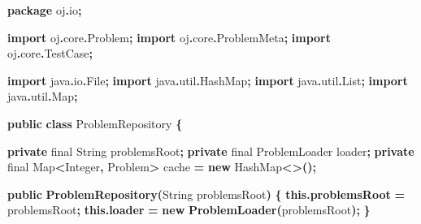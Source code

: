 \documentclass[
  11pt,
]{ctexart}
\newenvironment{Shaded}{\begin{snugshade}}{\end{snugshade}}
\newcommand{\BuiltInTok}[1]{#1}
\newcommand{\DataTypeTok}[1]{\textcolor[rgb]{0.13,0.29,0.53}{#1}}
\newcommand{\FunctionTok}[1]{\textcolor[rgb]{0.13,0.29,0.53}{\textbf{#1}}}
\newcommand{\ImportTok}[1]{#1}
\newcommand{\KeywordTok}[1]{\textcolor[rgb]{0.13,0.29,0.53}{\textbf{#1}}}
\newcommand{\NormalTok}[1]{#1}
\newcommand{\OperatorTok}[1]{\textcolor[rgb]{0.81,0.36,0.00}{\textbf{#1}}}
\begin{document}
\begin{Shaded}
\begin{Highlighting}[]
\KeywordTok{package}\ImportTok{ oj}\OperatorTok{.}\ImportTok{io}\OperatorTok{;}

\KeywordTok{import} \ImportTok{oj}\OperatorTok{.}\ImportTok{core}\OperatorTok{.}\ImportTok{Problem}\OperatorTok{;}
\KeywordTok{import} \ImportTok{oj}\OperatorTok{.}\ImportTok{core}\OperatorTok{.}\ImportTok{ProblemMeta}\OperatorTok{;}
\KeywordTok{import} \ImportTok{oj}\OperatorTok{.}\ImportTok{core}\OperatorTok{.}\ImportTok{TestCase}\OperatorTok{;}

\KeywordTok{import} \ImportTok{java}\OperatorTok{.}\ImportTok{io}\OperatorTok{.}\ImportTok{File}\OperatorTok{;}
\KeywordTok{import} \ImportTok{java}\OperatorTok{.}\ImportTok{util}\OperatorTok{.}\ImportTok{HashMap}\OperatorTok{;}
\KeywordTok{import} \ImportTok{java}\OperatorTok{.}\ImportTok{util}\OperatorTok{.}\ImportTok{List}\OperatorTok{;}
\KeywordTok{import} \ImportTok{java}\OperatorTok{.}\ImportTok{util}\OperatorTok{.}\ImportTok{Map}\OperatorTok{;}

\KeywordTok{public} \KeywordTok{class}\NormalTok{ ProblemRepository }\OperatorTok{\{}

    \KeywordTok{private} \DataTypeTok{final} \BuiltInTok{String}\NormalTok{ problemsRoot}\OperatorTok{;}
    \KeywordTok{private} \DataTypeTok{final}\NormalTok{ ProblemLoader loader}\OperatorTok{;}
    \KeywordTok{private} \DataTypeTok{final} \BuiltInTok{Map}\OperatorTok{\textless{}}\BuiltInTok{Integer}\OperatorTok{,}\NormalTok{ Problem}\OperatorTok{\textgreater{}}\NormalTok{ cache }\OperatorTok{=} \KeywordTok{new} \BuiltInTok{HashMap}\OperatorTok{\textless{}\textgreater{}();}

    \KeywordTok{public} \FunctionTok{ProblemRepository}\OperatorTok{(}\BuiltInTok{String}\NormalTok{ problemsRoot}\OperatorTok{)} \OperatorTok{\{}
        \KeywordTok{this}\OperatorTok{.}\FunctionTok{problemsRoot} \OperatorTok{=}\NormalTok{ problemsRoot}\OperatorTok{;}
        \KeywordTok{this}\OperatorTok{.}\FunctionTok{loader} \OperatorTok{=} \KeywordTok{new} \FunctionTok{ProblemLoader}\OperatorTok{(}\NormalTok{problemsRoot}\OperatorTok{);}
    \OperatorTok{\}}


\end{Highlighting}
\end{Shaded}
\end{document}
